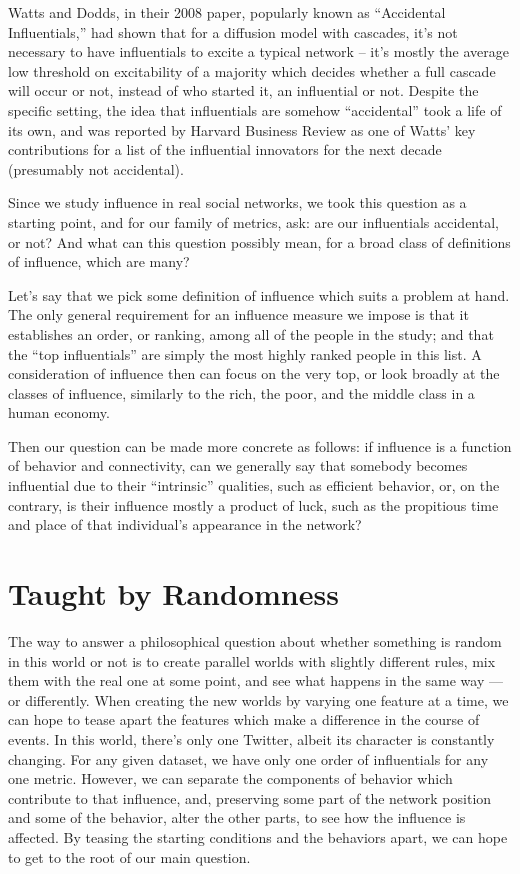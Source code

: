 \documentclass[10pt,oneside]{memoir}
\begin{document}
Watts and Dodds, in their 2008 paper, popularly known as ``Accidental Influentials,'' had shown that for a diffusion model with cascades, it's not necessary to have influentials to excite a typical network -- it's mostly the average low threshold on excitability of a majority which decides whether a full cascade will occur or not, instead of who started it, an influential or not.  Despite the specific setting, the idea that influentials are somehow ``accidental'' took a life of its own, and was reported by Harvard Business Review as one of Watts' key contributions for a list of the influential innovators for the next decade (presumably not accidental).


Since we study influence in real social networks, we took this question as a starting point, and for our family of metrics, ask: are our influentials accidental, or not?  And what can this question possibly mean, for a broad class of definitions of influence, which are many?


Let's say that we pick some definition of influence which suits a problem at hand.  The only general requirement for an influence measure we impose is that it establishes an order, or ranking, among all of the people in the study; and that the ``top influentials'' are simply the most highly ranked people in this list.  A consideration of influence then can focus on the very top, or look broadly at the classes of influence, similarly to the rich, the poor, and the middle class in a human economy.


Then our question can be made more concrete as follows: if influence is a function of behavior and connectivity, can we generally say that somebody becomes influential due to their ``intrinsic'' qualities, such as efficient behavior, or, on the contrary, is their influence mostly a product of luck, such as the propitious time and place of that individual's appearance in the network?


\section{Taught by Randomness}
\label{taughtbyrandomness}

The way to answer a philosophical question about whether something is random in this world or not is to create parallel worlds with slightly different rules, mix them with the real one at some point, and see what happens in the same way --- or differently.  When creating the new worlds by varying one feature at a time, we can hope to tease apart the features which make a difference in the course of events.  In this world, there's only one Twitter, albeit its character is constantly changing.  For any given dataset, we have only one order of influentials for any one metric.  However, we can separate the components of behavior which contribute to that influence, and, preserving some part of the network position and some of the behavior, alter the other parts, to see how the influence is affected.  By teasing the starting conditions and the behaviors apart, we can hope to get to the root of our main question.
\end{document}
